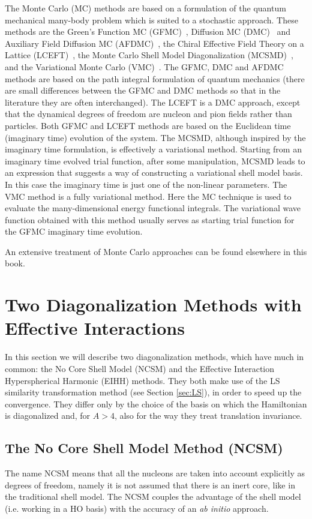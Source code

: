 The Monte Carlo (MC) methods are based on a formulation of the quantum mechanical many-body problem
which is suited to a stochastic approach.  These methods are
the Green's Function MC (GFMC)~\cite{Ka62},  Diffusion MC (DMC)~\cite{Ca87} and Auxiliary Field Diffusion MC (AFDMC)~\cite{ScF99}, 
the Chiral Effective Field Theory on a Lattice (LCEFT)~\cite{Le09},
the Monte Carlo Shell Model Diagonalization (MCSMD)~\cite{KoD97,HoM95,OtH01}, 
and the Variational Monte Carlo (VMC)~\cite{PiW01}. 
The GFMC, DMC and AFDMC methods are based on the path integral formulation of quantum mechanics
(there are small differences between the GFMC and DMC methods so that in the literature they are often interchanged).
The LCEFT is  a DMC approach, except that the dynamical degrees of freedom are nucleon and pion fields rather than particles.
Both GFMC and LCEFT methods are based on the Euclidean time (imaginary time) evolution of the system.  
The MCSMD, although inspired by the imaginary time formulation, is  effectively a variational method. 
Starting from an  imaginary time evolved trial function,  after some manipulation,  MCSMD leads to an expression that suggests 
a way of constructing a variational shell model basis. In this case the imaginary time is just one of the non-linear parameters.
The  VMC method is a fully variational method. Here the MC technique is used to evaluate 
the many-dimensional energy functional integrals. The variational wave function  obtained with this method  
usually serves as starting trial function for the GFMC imaginary time evolution.

An extensive treatment of   Monte Carlo approaches can be found elsewhere in this book.

\section{Two Diagonalization Methods with Effective Interactions}\label{sec:TWOEI}

In this section we will describe two diagonalization methods, which have much in common: the No Core Shell Model (NCSM) 
and the Effective Interaction Hyperspherical Harmonic (EIHH) methods. They  both make use of the LS similarity transformation method  
 (see Section \ref{sec:LS}), in order to speed up the convergence. 
They differ only by the choice of the basis on which the Hamiltonian is diagonalized and, 
for $A > 4$, also for the way they treat translation invariance. 

\subsection {The No Core Shell Model Method (NCSM)}\label{sec:NCSM}
The name NCSM means that all the nucleons  are taken into
account  explicitly as degrees of freedom, namely  it is not assumed that there is an inert core, like in the traditional shell model. 
The NCSM couples the  advantage of the shell model (i.e. working in a HO basis) with the accuracy of an {\it ab initio} approach.  

